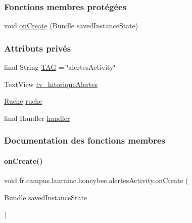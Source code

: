 \subsubsection*{Fonctions membres protégées}
\begin{DoxyCompactItemize}
\item 
void \hyperlink{classfr_1_1campus_1_1laurainc_1_1honeybee_1_1alertes_activity_ade0f23cba3f8f4aaa65367baea096d88}{on\+Create} (Bundle saved\+Instance\+State)
\end{DoxyCompactItemize}
\subsubsection*{Attributs privés}
\begin{DoxyCompactItemize}
\item 
final String \hyperlink{classfr_1_1campus_1_1laurainc_1_1honeybee_1_1alertes_activity_af9b493032767c7ef4a5fa29d194e3bb3}{T\+AG} = \char`\"{}alertes\+Activity\char`\"{}
\item 
Text\+View \hyperlink{classfr_1_1campus_1_1laurainc_1_1honeybee_1_1alertes_activity_a957b9ea11ac3b17e5058cb91f93500e3}{tv\+\_\+hitorique\+Alertes}
\item 
\hyperlink{classfr_1_1campus_1_1laurainc_1_1honeybee_1_1_ruche}{Ruche} \hyperlink{classfr_1_1campus_1_1laurainc_1_1honeybee_1_1alertes_activity_a60ca5664100d5d388966a90342e7c93f}{ruche}
\item 
final Handler \hyperlink{classfr_1_1campus_1_1laurainc_1_1honeybee_1_1alertes_activity_a79cdc606c07f6f7655c8c6351be23785}{handler}
\end{DoxyCompactItemize}


\subsubsection{Documentation des fonctions membres}
\mbox{\label{classfr_1_1campus_1_1laurainc_1_1honeybee_1_1alertes_activity_ade0f23cba3f8f4aaa65367baea096d88}} 
\paragraph{\texorpdfstring{on\+Create()}{onCreate()}}
{\footnotesize\ttfamily void fr.\+campus.\+laurainc.\+honeybee.\+alertes\+Activity.\+on\+Create (\begin{DoxyParamCaption}\item[{Bundle}]{saved\+Instance\+State }\end{DoxyParamCaption})\hspace{0.3cm}{\ttfamily [protected]}}



